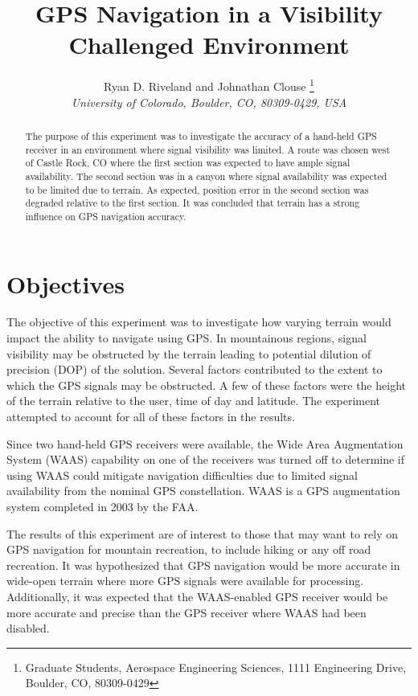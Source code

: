 \documentclass[]{aiaa-tc}%
\title{GPS Navigation in a Visibility Challenged Environment}
\author{
	Ryan D. Riveland and Johnathan Clouse%
	\thanks{Graduate Students, Aerospace Engineering Sciences, 1111 Engineering Drive, Boulder, CO, 80309-0429}\\
	{\normalsize\itshape
		University of Colorado, Boulder, CO, 80309-0429, USA}
}
\begin{document}
	
	\maketitle
	
	\begin{abstract}
		\noindent The purpose of this experiment was to investigate the accuracy of a hand-held GPS receiver in an environment where signal visibility was limited. A route was chosen west of Castle Rock, CO where the first section was expected to have ample signal availability. The second section was in a canyon where signal availability was expected to be limited due to terrain. As expected, position error in the second section was degraded relative to the first section. It was concluded that terrain has a strong influence on GPS navigation accuracy.
		
	\end{abstract}
	
	\newpage
	
	\tableofcontents
	
	\newpage
	
	\section{Objectives}
	
	\noindent The objective of this experiment was to investigate how varying terrain would impact the ability to navigate using GPS. In mountainous regions, signal visibility may be obstructed by the terrain leading to potential dilution of precision (DOP) of the solution. Several factors contributed to the extent to which the GPS signals may be obstructed. A few of these factors were the height of the terrain relative to the user, time of day and latitude. The experiment attempted to account for all of these factors in the results. 
	
	\vspace{5 mm}
	
	\noindent Since two hand-held GPS receivers were available, the Wide Area Augmentation System (WAAS) capability on one of the receivers was turned off to determine if using WAAS could mitigate navigation difficulties due to limited signal availability from the nominal GPS constellation. WAAS is a GPS augmentation system completed in 2003 by the FAA\cite{Misra:2012}. 
	
	\vspace{5 mm}
	
	\noindent The results of this experiment are of interest to those that may want to rely on GPS navigation for mountain recreation, to include hiking or any off road recreation. It was hypothesized that GPS navigation would be more accurate in wide-open terrain where more GPS signals were available for processing. Additionally, it was expected that the WAAS-enabled GPS receiver would be more accurate and precise than the GPS receiver where WAAS had been disabled.
	
\end{document}

